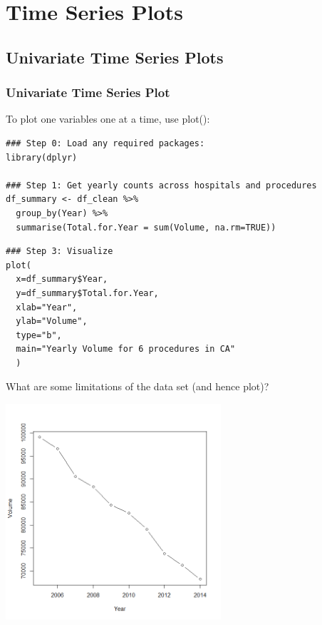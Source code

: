 




\section[Time Series Plots]{Time Series Plots}

\subsection{Univariate Time Series Plots}

\begin{frame}
\frametitle{Univariate Time Series Plot}

To plot one variables one at a time, use \ttfamily plot(): \normalfont 
		\begin{lstlisting}
### Step 0: Load any required packages:
library(dplyr)

### Step 1: Get yearly counts across hospitals and procedures
df_summary <- df_clean %>%
  group_by(Year) %>%
  summarise(Total.for.Year = sum(Volume, na.rm=TRUE))
  \end{lstlisting}

\newpage
  \begin{lstlisting}
### Step 3: Visualize
plot(
  x=df_summary$Year,
  y=df_summary$Total.for.Year,
  xlab="Year",
  ylab="Volume",
  type="b",
  main="Yearly Volume for 6 procedures in CA"
  )
		\end{lstlisting}
What are some limitations of the data set (and hence plot)?

\newpage
      \begin{center}
        \includegraphics[width=0.6\textwidth]{images/univar_ts.png}
       \end{center}

\end{frame}

